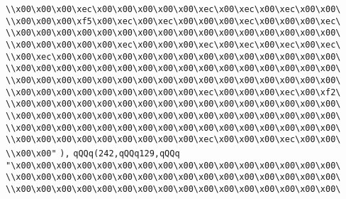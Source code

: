 \verb|\\x00\x00\x00\xec\x00\x00\x00\x00\x00\xec\x00\xec\x00\xec\x00\x00\|\newline
\verb|\\x00\x00\x00\xf5\x00\xec\x00\xec\x00\x00\x00\xec\x00\x00\x00\xec\|\newline
\verb|\\x00\x00\x00\x00\x00\x00\x00\x00\x00\x00\x00\x00\x00\x00\x00\x00\|\newline
\verb|\\x00\x00\x00\x00\x00\xec\x00\x00\x00\xec\x00\xec\x00\xec\x00\xec\|\newline
\verb|\\x00\xec\x00\x00\x00\x00\x00\x00\x00\x00\x00\x00\x00\x00\x00\x00\|\newline
\verb|\\x00\x00\x00\x00\x00\x00\x00\x00\x00\x00\x00\x00\x00\x00\x00\x00\|\newline
\verb|\\x00\x00\x00\x00\x00\x00\x00\x00\x00\x00\x00\x00\x00\x00\x00\x00\|\newline
\verb|\\x00\x00\x00\x00\x00\x00\x00\x00\x00\xec\x00\x00\x00\xec\x00\xf2\|\newline
\verb|\\x00\x00\x00\x00\x00\x00\x00\x00\x00\x00\x00\x00\x00\x00\x00\x00\|\newline
\verb|\\x00\x00\x00\x00\x00\x00\x00\x00\x00\x00\x00\x00\x00\x00\x00\x00\|\newline
\verb|\\x00\x00\x00\x00\x00\x00\x00\x00\x00\x00\x00\x00\x00\x00\x00\x00\|\newline
\verb|\\x00\x00\x00\x00\x00\x00\x00\x00\x00\xec\x00\x00\x00\xec\x00\x00\|\newline
\verb|\\x00\x00"|\newline
\verb|),|\newline
\verb|qQQq(242,qQQq129,qQQq|\newline
\verb|"\x00\x00\x00\x00\x00\x00\x00\x00\x00\x00\x00\x00\x00\x00\x00\x00\|\newline
\verb|\\x00\x00\x00\x00\x00\x00\x00\x00\x00\x00\x00\x00\x00\x00\x00\x00\|\newline
\verb|\\x00\x00\x00\x00\x00\x00\x00\x00\x00\x00\x00\x00\x00\x00\x00\x00\|\newline

